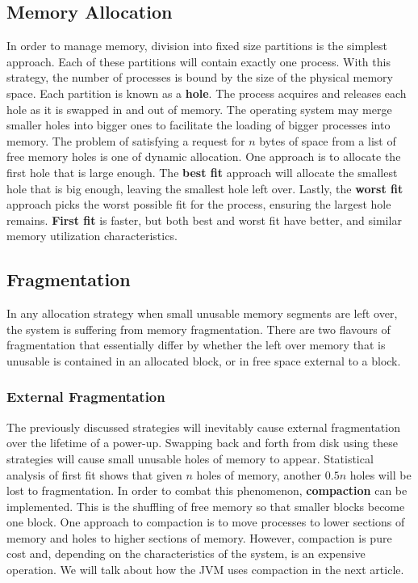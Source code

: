 \documentclass[10pt,a4paper]{article}
\begin{document}
\subsection{Memory Allocation}
In order to manage memory, division into fixed size partitions is the simplest approach. Each of these partitions will contain exactly one process. With this strategy, the number of processes is bound by the size of the physical memory space. Each partition is known as a {\bf hole}. The process acquires and releases each hole as it is swapped in and out of memory. The operating system may merge smaller holes into bigger ones to facilitate the loading of bigger processes into memory. The problem of satisfying a request for $n$ bytes of space from a list of free memory holes is one of dynamic allocation. One approach is to allocate the first hole that is large enough. The {\bf best fit} approach will allocate the smallest hole that is big enough, leaving the smallest hole left over. Lastly, the {\bf worst fit} approach picks the worst possible fit for the process, ensuring the largest hole remains. {\bf First fit} is faster, but both best and worst fit have better, and similar memory utilization characteristics. 
\subsection{Fragmentation}
In any allocation strategy when small unusable memory segments are left over, the system is suffering from memory fragmentation. There are two flavours of fragmentation that essentially differ by whether the left over memory that is unusable is contained in an allocated block, or in free space external to a block. 
\subsubsection{External Fragmentation}
The previously discussed strategies will inevitably cause external fragmentation over the lifetime of a power-up. Swapping back and forth from disk using these strategies will cause small unusable holes of memory to appear. Statistical analysis of first fit shows that given $n$ holes of memory, another $0.5n$ holes will be lost to fragmentation. In order to combat this phenomenon, {\bf compaction} can be implemented. This is the shuffling of free memory so that smaller blocks become one block. One approach to compaction is to move processes to lower sections of memory and holes to higher sections of memory. However, compaction is pure cost and, depending on the characteristics of the system, is an expensive operation. We will talk about how the JVM uses compaction in the next article. 
\end{document}
